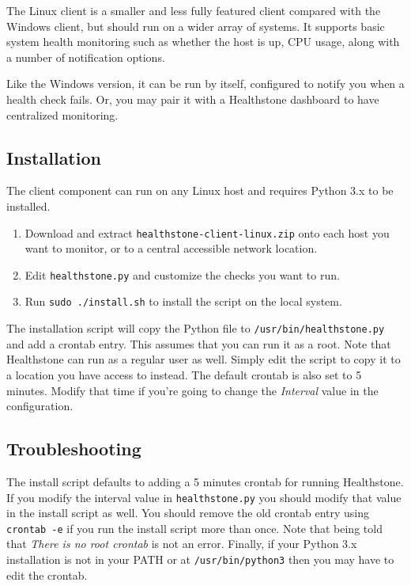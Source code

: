 \documentclass[11pt]{article}
\begin{document}
The Linux client is a smaller and less fully featured client compared with the Windows client, but should run on a wider array of systems. It supports basic system health monitoring such as whether the host is up, CPU usage, along with a number of notification options.

Like the Windows version, it can be run by itself, configured to notify you when a health check fails. Or, you may pair it with a Healthstone dashboard to have centralized monitoring.

\subsection{Installation}

The client component can run on any Linux host and requires Python 3.x to be installed.

\begin{enumerate}
\item Download and extract \texttt{healthstone-client-linux.zip} onto each host you want to monitor, or to a central accessible network location.
\item Edit \texttt{healthstone.py} and customize the checks you want to run.
\item Run \texttt{sudo ./install.sh} to install the script on the local system.
\end{enumerate}

The installation script will copy the Python file to \texttt{/usr/bin/healthstone.py} and add a crontab entry. This assumes that you can run it as a root. Note that Healthstone can run as a regular user as well. Simply edit the script to copy it to a location you have access to instead. The default crontab is also set to 5 minutes. Modify that time if you're going to change the \textit{Interval} value in the configuration.

\subsection{Troubleshooting}

The install script defaults to adding a 5 minutes crontab for running Healthstone. If you modify the interval value in \texttt{healthstone.py} you should modify that value in the install script as well. You should remove the old crontab entry using \texttt{crontab -e} if you run the install script more than once. Note that being told that \textit{There is no root crontab} is not an error. Finally, if your Python 3.x installation is not in your PATH or at \texttt{/usr/bin/python3} then you may have to edit the crontab.
\end{document}
